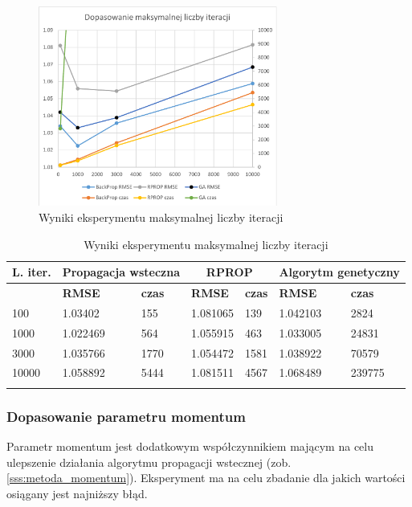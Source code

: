 \documentclass[twoside]{iisthesis}
\begin{document}
			\begin{figure}[!ht]
				\centering
				\includegraphics[width=0.7\textwidth]{expiterations}			
				\caption{Wyniki eksperymentu maksymalnej liczby iteracji}
				\label{fig:expiterations}
			\end{figure}
			

			\begin{longtable}{l||ll|ll|ll}		
				\label{tab:expiterations}		
				\textbf{L. iter.} & \multicolumn{2}{c|}{\textbf{Propagacja wsteczna}}  & \multicolumn{2}{c|}{\textbf{RPROP}} & \multicolumn{2}{c}{\textbf{Algorytm genetyczny}}  \\
				\hline
				& \textbf{RMSE} & \textbf{czas} & \textbf{RMSE} & \textbf{czas} & \textbf{RMSE} & \textbf{czas} \\
				\hline
				100 & 1.03402 & 155 & 1.081065 & 139 & 1.042103 & 2824 \\
				1000  & 1.022469 & 564 & 1.055915 & 463 & 1.033005 & 24831  \\
				3000  & 1.035766 & 1770 & 1.054472 & 1581  & 1.038922 & 70579  \\
				10000 & 1.058892  & 5444 & 1.081511  & 4567  & 1.068489 & 239775 \\
				\caption{Wyniki eksperymentu maksymalnej liczby iteracji}
			\end{longtable}
		
		\subsubsection{Dopasowanie parametru momentum} 
		\label{exp:momentum}
			
		Parametr momentum jest dodatkowym współczynnikiem mającym na celu ulepszenie działania algorytmu propagacji wstecznej (zob. \ref{sss:metoda_momentum}). Eksperyment ma na celu zbadanie dla jakich wartości osiągany jest najniższy błąd.
			
\end{document}
